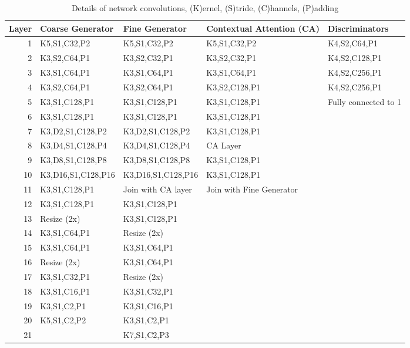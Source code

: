 \documentclass[twocolumn]{article}
\begin{document}
\begin{table*}[htbp]
\caption{\label{table:convolutions}Details of network convolutions, (K)ernel, (S)tride, (C)hannels, (P)adding}
\centering
\begin{tabular}{rllll}
Layer & Coarse Generator & Fine Generator & Contextual Attention (CA) & Discriminators\\[0pt]
\hline
1 & K5,S1,C32,P2 & K5,S1,C32,P2 & K5,S1,C32,P2 & K4,S2,C64,P1\\[0pt]
2 & K3,S2,C64,P1 & K3,S2,C32,P1 & K3,S2,C32,P1 & K4,S2,C128,P1\\[0pt]
3 & K3,S1,C64,P1 & K3,S1,C64,P1 & K3,S1,C64,P1 & K4,S2,C256,P1\\[0pt]
4 & K3,S2,C64,P1 & K3,S2,C64,P1 & K3,S2,C128,P1 & K4,S2,C256,P1\\[0pt]
5 & K3,S1,C128,P1 & K3,S1,C128,P1 & K3,S1,C128,P1 & Fully connected to 1\\[0pt]
6 & K3,S1,C128,P1 & K3,S1,C128,P1 & K3,S1,C128,P1 & \\[0pt]
7 & K3,D2,S1,C128,P2 & K3,D2,S1,C128,P2 & K3,S1,C128,P1 & \\[0pt]
8 & K3,D4,S1,C128,P4 & K3,D4,S1,C128,P4 & CA Layer & \\[0pt]
9 & K3,D8,S1,C128,P8 & K3,D8,S1,C128,P8 & K3,S1,C128,P1 & \\[0pt]
10 & K3,D16,S1,C128,P16 & K3,D16,S1,C128,P16 & K3,S1,C128,P1 & \\[0pt]
11 & K3,S1,C128,P1 & Join with CA layer & Join with Fine Generator & \\[0pt]
12 & K3,S1,C128,P1 & K3,S1,C128,P1 &  & \\[0pt]
13 & Resize (2x) & K3,S1,C128,P1 &  & \\[0pt]
14 & K3,S1,C64,P1 & Resize (2x) &  & \\[0pt]
15 & K3,S1,C64,P1 & K3,S1,C64,P1 &  & \\[0pt]
16 & Resize (2x) & K3,S1,C64,P1 &  & \\[0pt]
17 & K3,S1,C32,P1 & Resize (2x) &  & \\[0pt]
18 & K3,S1,C16,P1 & K3,S1,C32,P1 &  & \\[0pt]
19 & K3,S1,C2,P1 & K3,S1,C16,P1 &  & \\[0pt]
20 & K5,S1,C2,P2 & K3,S1,C2,P1 &  & \\[0pt]
21 &  & K7,S1,C2,P3 &  & \\[0pt]
\end{tabular}
\end{table*}
\end{document}
